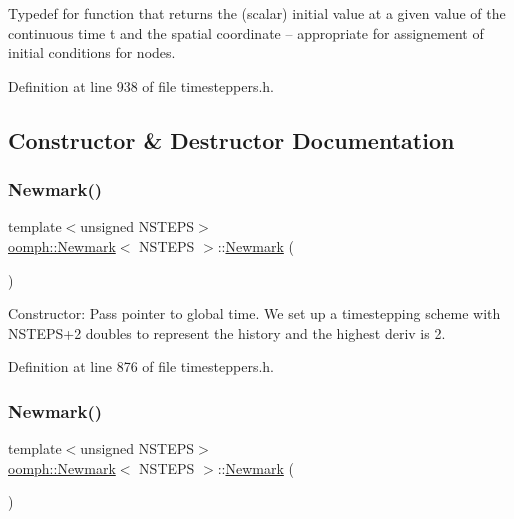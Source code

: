 Typedef for function that returns the (scalar) initial value at a given value of the continuous time t and the spatial coordinate -- appropriate for assignement of initial conditions for nodes. 



Definition at line 938 of file timesteppers.\+h.



\subsection{Constructor \& Destructor Documentation}
\mbox{\label{classoomph_1_1Newmark_a0fb7152525d4098b4adc5f7956c8c73f}} 
\subsubsection{\texorpdfstring{Newmark()}{Newmark()}\hspace{0.1cm}{\footnotesize\ttfamily [1/2]}}
{\footnotesize\ttfamily template$<$unsigned N\+S\+T\+E\+PS$>$ \\
\hyperlink{classoomph_1_1Newmark}{oomph\+::\+Newmark}$<$ N\+S\+T\+E\+PS $>$\+::\hyperlink{classoomph_1_1Newmark}{Newmark} (\begin{DoxyParamCaption}{ }\end{DoxyParamCaption})\hspace{0.3cm}{\ttfamily [inline]}}



Constructor\+: Pass pointer to global time. We set up a timestepping scheme with N\+S\+T\+E\+P\+S+2 doubles to represent the history and the highest deriv is 2. 



Definition at line 876 of file timesteppers.\+h.

\mbox{\label{classoomph_1_1Newmark_a439fe6ce251eea0cf7e0a5e8b3a0406e}} 
\subsubsection{\texorpdfstring{Newmark()}{Newmark()}\hspace{0.1cm}{\footnotesize\ttfamily [2/2]}}
{\footnotesize\ttfamily template$<$unsigned N\+S\+T\+E\+PS$>$ \\
\hyperlink{classoomph_1_1Newmark}{oomph\+::\+Newmark}$<$ N\+S\+T\+E\+PS $>$\+::\hyperlink{classoomph_1_1Newmark}{Newmark} (\begin{DoxyParamCaption}\item[{const \hyperlink{classoomph_1_1Newmark}{Newmark}$<$ N\+S\+T\+E\+PS $>$ \&}]{ }\end{DoxyParamCaption})\hspace{0.3cm}{\ttfamily [inline]}}




